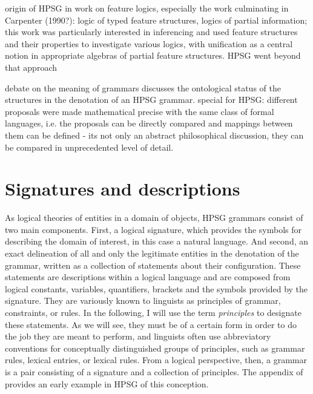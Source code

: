 \documentclass[output=paper
                ,modfonts
                ,nonflat
	        ,collection
	        ,collectionchapter
	        ,collectiontoclongg
 	        ,biblatex
                ,babelshorthands
                ,newtxmath
                ,draftmode
                ,colorlinks, citecolor=brown
]{./langsci/langscibook}
\begin{document}
{origin of HPSG in work on feature logics, especially the work culminating in Carpenter (1990?): logic of typed feature structures, logics of partial information; this work was particularly interested in inferencing and used feature structures and their properties to investigate various logics, with unification as a central notion in appropriate algebras of partial feature structures. HPSG went beyond that approach

debate on the meaning of grammars discusses the ontological status of the structures in the denotation of an HPSG grammar. special for HPSG: different proposals were made mathematical precise with the same class of formal languages, i.e. the proposals can be directly compared and mappings between them can be defined - its not only an abstract philosophical discussion, they can be compared in unprecedented level of detail.


\section{Signatures and descriptions}
\label{sec-signatures}

As logical theories of entities in a domain of objects, HPSG grammars
consist of two main components. First, a logical signature, which
provides the symbols for describing the domain of interest, in this
case a natural language. And second, an exact delineation of all and
only the legitimate entities in the denotation of the grammar, written
as a collection of statements about their configuration. These statements are
descriptions within a logical language and are composed from logical
constants, variables, quantifiers, brackets and the symbols provided
by the signature. They are variously known to linguists as principles
of grammar, constraints, or rules. In the following, I will use the
term \emph{principles} to designate these statements.
As we will see, they must be of a certain form in order to do the job
they are meant to perform, and linguists often use abbreviatory
conventions for conceptually distinguished groups of principles, such
as grammar rules, lexical entries, or lexical rules. From a logical
perspective,
then, a grammar is a pair consisting of a signature and a collection
of principles.  The appendix of \citet{PollardSag1994} provides an
early example in HPSG of this conception.

}
\end{document}
